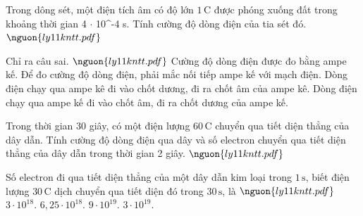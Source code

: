 \begin{ex}
Trong dông sét, một điện tích âm có độ lớn $1\,\mathrm{C}$ được phóng xuống đất trong khoảng thời gian 4 $\cdot$  10^{-4} s. Tính cường độ dòng điện của tia sét đó. $\nguon{ly11 kntt.pdf}$
\choiceTF

\end{ex}

\begin{ex}
Chỉ ra câu sai. $\nguon{ly11 kntt.pdf}$
\choice
{Cường độ dòng điện được đo bằng ampe kế.}
{Để đo cường độ dòng điện, phải mắc nối tiếp ampe kế với mạch điện.}
{Dòng điện chạy qua ampe kê đi vào chốt dương, đi ra chốt âm của ampe kê.}
{\True Dòng điện chạy qua ampe kế đi vào chốt âm, đi ra chốt dương của ampe kế.}
\end{ex}

\begin{ex}
Trong thời gian 30 giây, có một điện lượng $60\,\mathrm{C}$ chuyển qua tiết diện thẳng của dây dẫn. Tính cường độ dòng điện qua dây và số electron chuyển qua tiết diện thẳng của dây dẫn trong thời gian 2 giây. $\nguon{ly11 kntt.pdf}$
\choiceTF

\end{ex}

\begin{ex}
Số electron đi qua tiết diện thẳng của một dây dẫn kim loại trong $1\,\mathrm{s}$, biết điện lượng $30\,\mathrm{C}$ dịch chuyển qua tiết diện đó trong $30\,\mathrm{s}$, là $\nguon{ly11 kntt.pdf}$
\choice
{$3\cdot 10^{18}$.}
{\True $6,25\cdot 10^{18}$.}
{$9\cdot 10^{19}$.}
{$3\cdot 10^{19}$.}
\end{ex}

